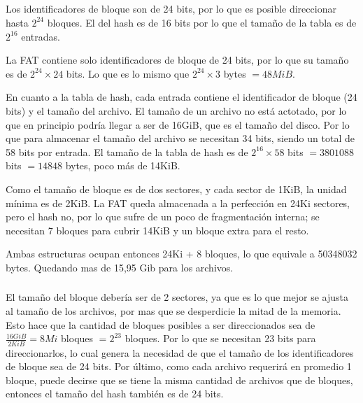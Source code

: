 \subsection{}

\subsubsection{}
Los identificadores de bloque son de 24 bits, por lo que es posible
direccionar hasta $2^{24}$ bloques. El del hash es de 16 bits por lo que el
tamaño de la tabla es de $2^{16}$ entradas.

La FAT contiene solo identificadores de bloque de 24 bits, por lo que su
tamaño es de $2^{24} \times 24$ bits. Lo que es lo mismo que
$2^{24} \times 3$ bytes $= 48MiB$.

En cuanto a la tabla de hash, cada entrada contiene el identificador de bloque
(24 bits) y el tamaño del archivo. El tamaño de un archivo no está actotado,
por lo que en principio podría llegar a ser de 16GiB, que es el tamaño del
disco. Por lo que para almacenar el tamaño del archivo se necesitan 34 bits,
siendo un total de 58 bits por entrada. El tamaño de la tabla de hash es de
$2^{16} \times 58$ bits $= 3801088$ bits $=14848$ bytes, poco más de 14KiB.

Como el tamaño de bloque es de dos sectores, y cada sector de 1KiB, la unidad
mínima es de 2KiB. La FAT queda almacenada a la perfección en 24Ki sectores,
pero el hash no, por lo que sufre de un poco de fragmentación interna; se
necesitan 7 bloques para cubrir 14KiB y un bloque extra para el resto.

Ambas estructuras ocupan entonces 24Ki + 8 bloques, lo que equivale a 50348032
bytes. Quedando mas de 15,95 Gib para los archivos.

\subsubsection{}
El tamaño del bloque debería ser de 2 sectores, ya que es lo que mejor se
ajusta al tamaño de los archivos, por mas que se desperdicie la mitad de la
memoria. Esto hace que la cantidad de bloques posibles a ser direccionados sea
de $\frac{16GiB}{2KiB} = 8Mi$ bloques $= 2^23$ bloques. Por lo que se
necesitan 23 bits para direccionarlos, lo cual genera la necesidad de que el
tamaño de los identificadores de bloque sea de 24 bits. Por último, como cada
archivo requerirá en promedio 1 bloque, puede decirse que se tiene la misma
cantidad de archivos que de bloques, entonces el tamaño del hash también es de
24 bits.

